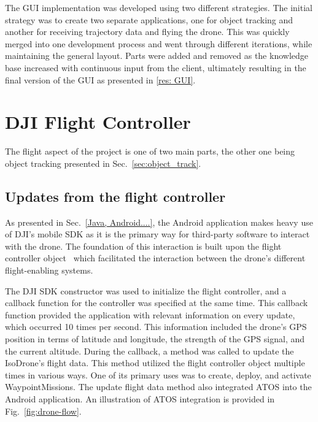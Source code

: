 The GUI implementation was developed using two different strategies. The initial strategy was to create two separate applications, one for object tracking   and another for receiving trajectory data and flying the drone. This was quickly merged into one development process and went through different iterations, while maintaining the general layout. Parts were added and removed as the knowledge base increased with continuous input from the client, ultimately resulting in the final version of the GUI as presented in \ref{res: GUI}.

\section{DJI Flight Controller} \label{sec:DJI_flight_controll}
The flight aspect of the project is one of two main parts, the other one being object tracking presented in Sec.~\ref{sec:object_track}.

\subsection{Updates from the flight controller}
As presented in Sec.~\ref{Java, Android....}, the Android application makes heavy use of DJI's mobile SDK as it is the primary way for third-party software to interact with the drone. The foundation of this interaction is built upon the flight controller object~\cite{dji_flightcontroller} which facilitated the interaction between the drone's different flight-enabling systems. 
\newline

The DJI SDK constructor was used to initialize the flight controller, and a callback function for the controller was specified at the same time. This callback function provided the application with relevant information on every update, which occurred 10 times per second. This information included the drone's GPS position in terms of latitude and longitude, the strength of the GPS signal, and the current altitude. During the callback, a method was called to update the IsoDrone's flight data. This method utilized the flight controller object multiple times in various ways. One of its primary uses was to create, deploy, and activate WaypointMissions. The update flight data method also integrated ATOS into the Android application. An illustration of ATOS integration is provided in Fig.~\ref{fig:drone-flow}.

